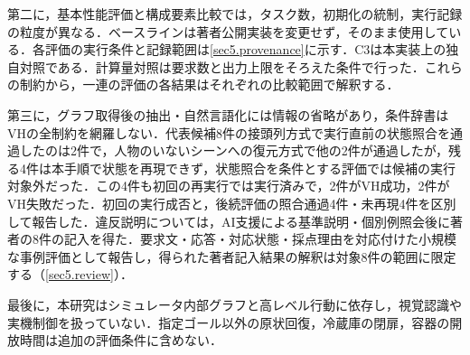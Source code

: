 第二に，基本性能評価と構成要素比較では，タスク数，初期化の統制，実行記録の粒度が異なる．ベースラインは著者公開実装を変更せず，そのまま使用している．各評価の実行条件と記録範囲は\ref{sec5.provenance}に示す．C3は本実装上の独自対照である．計算量対照は要求数と出力上限をそろえた条件で行った．これらの制約から，一連の評価の各結果はそれぞれの比較範囲で解釈する．

第三に，グラフ取得後の抽出・自然言語化には情報の省略があり，条件辞書はVHの全制約を網羅しない．代表候補8件の接頭列方式で実行直前の状態照合を通過したのは2件で，人物のいないシーンへの復元方式で他の2件が通過したが，残る4件は本手順で状態を再現できず，状態照合を条件とする評価では候補の実行対象外だった．この4件も初回の再実行では実行済みで，2件がVH成功，2件がVH失敗だった．初回の実行成否と，後続評価の照合通過4件・未再現4件を区別して報告した．違反説明については，AI支援による基準説明・個別例照会後に著者の8件の記入を得た．要求文・応答・対応状態・採点理由を対応付けた小規模な事例評価として報告し，得られた著者記入結果の解釈は対象8件の範囲に限定する（\ref{sec5.review}）．

最後に，本研究はシミュレータ内部グラフと高レベル行動に依存し，視覚認識や実機制御を扱っていない．指定ゴール以外の原状回復，冷蔵庫の閉扉，容器の開放時間は追加の評価条件に含めない．
